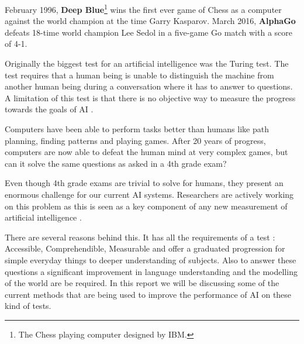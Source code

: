 February 1996, \textbf{Deep Blue}\footnote{The Chess playing computer designed by IBM.} wins the first ever game of Chess as a computer against the world champion at the time Garry Kasparov.
March 2016, \textbf{AlphaGo} defeats 18-time world champion Lee Sedol in a five-game Go match with a score of 4-1.

Originally the biggest test for an artificial intelligence was the Turing test.
The test requires that a human being is unable to distinguish the machine from another human being during a conversation where it has to answer to questions.
A limitation of this test is that there is no objective way to measure the progress towards the goals of AI \cite{honorstudent}.

Computers have been able to perform tasks better than humans like path planning, finding patterns and playing games. After 20 years of progress, computers are now able to defeat the human mind at very complex games, but can it solve the same questions as asked in a 4th grade exam?

Even though 4th grade exams are trivial to solve for humans, they present an enormous challenge for our current AI systems. Researchers are actively working on this problem as this is seen as a key component of any new measurement of artificial intelligence \cite{honorstudent}.

There are several reasons behind this.
It has all the requirements of a test \cite{honorstudent}: Accessible, Comprehendible, Measurable and offer a graduated progression for simple everyday things to deeper understanding of subjects.
Also to answer these questions a significant improvement in language understanding and the modelling of the world are be required. In this report we will be discussing some of the current methods that are being used to improve the performance of AI on these kind of tests.